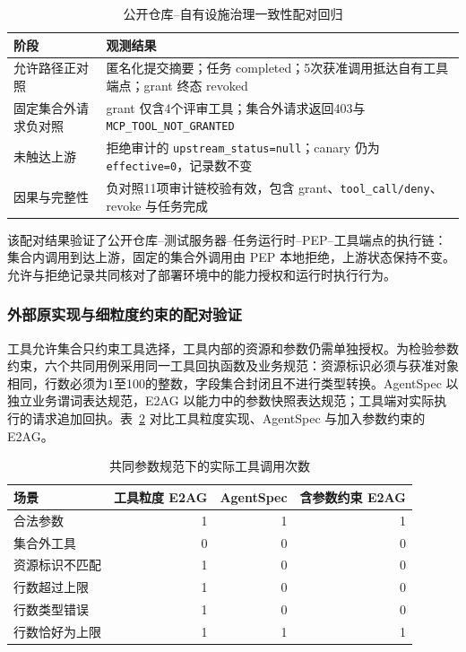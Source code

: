 \begin{table}[htbp]
\centering
\caption{公开仓库--自有设施治理一致性配对回归}
\label{tab:rq2-field-v11}
\small
\begin{tabular}{p{35mm}p{95mm}}
\toprule
阶段 & 观测结果 \\
\midrule
允许路径正对照 & 匿名化提交摘要；任务 completed；5次获准调用抵达自有工具端点；grant 终态 revoked \\
固定集合外请求负对照 & grant 仅含4个评审工具；集合外请求返回403与 \texttt{MCP\_TOOL\_NOT\_GRANTED} \\
未触达上游 & 拒绝审计的 \texttt{upstream\_status=null}；canary 仍为 \texttt{effective=0}，记录数不变 \\
因果与完整性 & 负对照11项审计链校验有效，包含 grant、\texttt{tool\_call/deny}、revoke 与任务完成 \\
\bottomrule
\end{tabular}
\end{table}

该配对结果验证了公开仓库--测试服务器--任务运行时--PEP--工具端点的执行链：集合内调用到达上游，固定的集合外调用由 PEP 本地拒绝，上游状态保持不变。允许与拒绝记录共同核对了部署环境中的能力授权和运行时执行行为。

\subsubsection{外部原实现与细粒度约束的配对验证}
\label{sec:external-rr022}

工具允许集合只约束工具选择，工具内部的资源和参数仍需单独授权。为检验参数约束，六个共同用例采用同一工具回执函数及业务规范：资源标识必须与获准对象相同，行数必须为1至100的整数，字段集合封闭且不进行类型转换。AgentSpec 以独立业务谓词表达规范，E2AG 以能力中的参数快照表达规范；工具端对实际执行的请求追加回执。表~\ref{tab:parameters-rr022} 对比工具粒度实现、AgentSpec 与加入参数约束的 E2AG。

\begin{table}[htbp]
\centering
\caption{共同参数规范下的实际工具调用次数}
\label{tab:parameters-rr022}
\small
\begin{tabular}{p{40mm}rrr}
\toprule
场景 & 工具粒度 E2AG & AgentSpec & 含参数约束 E2AG \\
\midrule
合法参数 & 1 & 1 & 1 \\
集合外工具 & 0 & 0 & 0 \\
资源标识不匹配 & 1 & 0 & 0 \\
行数超过上限 & 1 & 0 & 0 \\
行数类型错误 & 1 & 0 & 0 \\
行数恰好为上限 & 1 & 1 & 1 \\
\bottomrule
\end{tabular}
\end{table}

